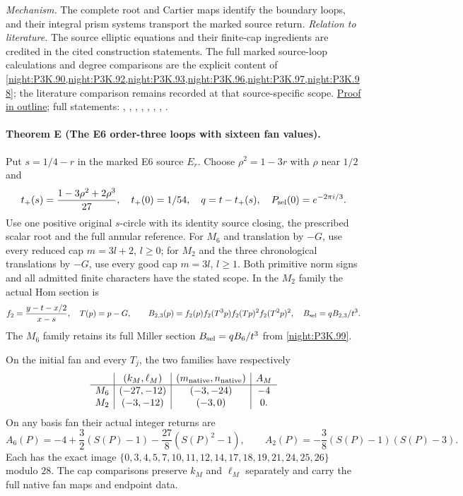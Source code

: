 \textit{Mechanism.} The complete root and Cartier maps identify the boundary loops,
and their integral prism systems transport the marked source return.
\textit{Relation to literature.} The source elliptic equations and their finite-cap ingredients
are credited in the cited construction statements. The full marked
source-loop calculations and degree comparisons are the explicit
content of \cref{night:P3K.90,night:P3K.92,night:P3K.93,night:P3K.96,night:P3K.97,night:P3K.98};
the literature comparison remains recorded at that source-specific scope.
\hyperlink{outline-IV-D}{Proof in outline}; full statements: , , , , , , , .

\hypertarget{main-IV-E}{}
\paragraph{Theorem E (The E6 order-three loops with sixteen fan values).}
\label{series:IV:E}
Put $s=1/4-r$ in the marked E6 source $E_r$. Choose
$\rho^2=1-3r$ with $\rho$ near $1/2$ and
\[
 t_+(s)=\frac{1-3\rho^2+2\rho^3}{27},\quad
 t_+(0)=1/54,\quad q=t-t_+(s),\quad
 P_{\rm sel}(0)=e^{-2\pi i/3}.
\]
Use one positive original $s$-circle with its identity source
closing, the prescribed scalar root and the full annular reference.
For $M_6$ and translation by $-G$, use every reduced cap
$m=3l+2$, $l\ge0$; for $M_2$ and the three chronological
translations by $-G$, use every good cap $m=3l$, $l\ge1$.
Both primitive norm signs and all admitted finite characters have
the stated scope. In the $M_2$ family the actual Hom section is
\[
 f_2=\frac{y-t-x/2}{x-s},\quad T(p)=p-G,\qquad
 B_{2,3}(p)=f_2(p)f_2(T^3p)f_2(Tp)^2f_2(T^2p)^2,
 \quad B_{\rm sel}=qB_{2,3}/t^3.
\]
The $M_6$ family retains its full Miller section
$B_{\rm sel}=qB_6/t^3$ from \cref{night:P3K.99}.

On the initial fan and every $T_j$, the two families have respectively
\[
\begin{array}{c|c|c|c}
 & (k_M,\ell_M)&(m_{\rm native},n_{\rm native})&A_M\\\hline
M_6&(-27,-12)&(-3,-24)&-4\\
M_2&(-3,-12)&(-3,0)&0.
\end{array}
\]
On any basis fan their actual integer returns are
\[
 A_6(P)=-4+\frac32(S(P)-1)-\frac{27}{8}(S(P)^2-1),\qquad
 A_2(P)=-\frac38(S(P)-1)(S(P)-3).
\]
Each has the exact image
$\{0,3,4,5,7,10,11,12,14,17,18,19,21,24,25,26\}$ modulo $28$.
The cap comparisons preserve $k_M$ and $\ell_M$ separately and
carry the full native fan maps and endpoint data.

